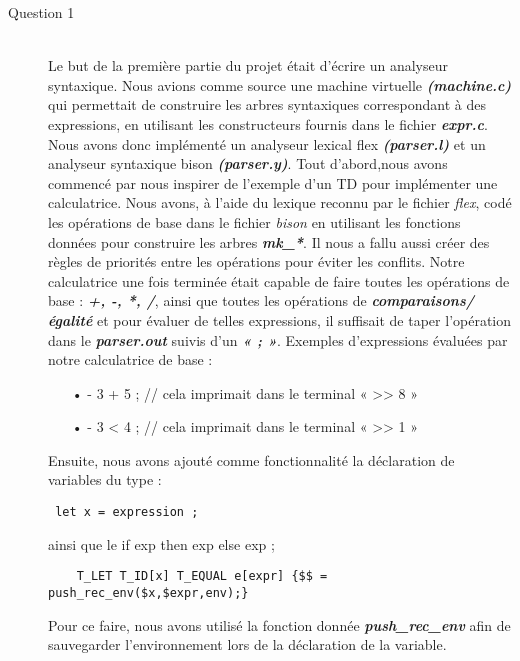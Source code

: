 \documentclass{article}
\begin{document}
\begin{description}




\item[Question 1]\hfill \\

Le but de la première partie du projet était d'écrire un analyseur 
syntaxique. Nous avions comme source une machine virtuelle \textbf{\emph{(machine.c) }}
qui permettait de construire les arbres syntaxiques correspondant à des 
expressions, en utilisant les constructeurs fournis dans le fichier \emph{\textbf{expr.c}}.
\bigskip
Nous avons donc implémenté un analyseur lexical flex \textbf{\emph{(parser.l)}} et un 
analyseur syntaxique bison \textbf{\emph{(parser.y)}}. 
\bigskip
Tout d'abord,nous avons commencé par nous inspirer de l'exemple 
d'un TD pour implémenter une calculatrice. Nous avons, à l'aide du lexique 
reconnu par le fichier \emph{flex}, codé les opérations de base dans le fichier \emph{bison} 
en utilisant les fonctions données pour construire les arbres \textbf{\emph{mk\_*}}. Il nous a 
fallu aussi créer des règles de priorités entre les opérations pour éviter les 
conflits.
\bigskip
Notre calculatrice une fois terminée était capable de faire toutes les 
opérations de base : \textbf{\emph{+, -, *, /}}, ainsi que toutes les opérations de 
\textbf{\emph{comparaisons/égalité}} et pour évaluer de telles expressions, il suffisait de 
taper l'opération dans le \textbf{\emph{parser.out}} suivis d'un \textbf{\emph{« ; »}}.
\bigskip
Exemples d'expressions évaluées par notre calculatrice de base :
\bigskip
\begin{itemize}
\item[•] -  3 + 5 ;  // cela imprimait dans le terminal « >> 8 »
\item[•]-  3 < 4 ;  // cela imprimait dans le terminal « >> 1 »
\end{itemize}
\bigskip
Ensuite, nous avons ajouté comme fonctionnalité la déclaration de variables du type :
\bigskip
 \begin{verbatim}
 let x = expression ; 
 \end{verbatim}
 \bigskip 
 ainsi que le if exp then exp else exp ;
 \bigskip
\begin{verbatim}
	T_LET T_ID[x] T_EQUAL e[expr] {$$ = push_rec_env($x,$expr,env);}
\end{verbatim}
\bigskip
  Pour ce faire, nous avons utilisé la fonction donnée \emph{\textbf{push\_rec\_env}} afin de sauvegarder
  l'environnement lors de la déclaration de la variable.
  

\end{description}
\end{document}
